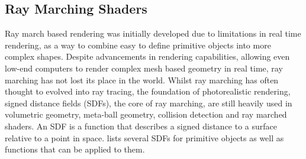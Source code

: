 \documentclass{l4proj}
\begin{document}
\subsection{Ray Marching Shaders}

Ray march based rendering was initially developed due to limitations in real time rendering, as a way to combine easy to define primitive objects into more complex shapes. Despite advancements in rendering capabilities, allowing even low-end computers to render complex mesh based geometry in real time, ray marching has not lost its place in the world. 
Whilst ray marching has often thought to evolved into ray tracing, the foundation of photorealistic rendering, signed distance fields (SDFs), the core of ray marching, are still heavily used in volumetric geometry, meta-ball geometry, collision detection and ray marched shaders.
An SDF is a function that describes a signed distance to a surface relative to a point in space. \citet{quilez_distance_nodate} lists several SDFs for primitive objects as well as functions that can be applied to them.
\end{document}
